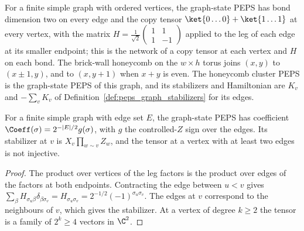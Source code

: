 \begin{definition}
    \label{def:peps_honeycomb_cluster}
    \leanok
    For a finite simple graph with ordered vertices, the graph-state PEPS
    has bond dimension two on every edge and the copy tensor
    $\ket{0\ldots0}+\ket{1\ldots1}$ at every vertex, with the matrix
    $H=\frac1{\sqrt2}\left(\begin{smallmatrix}1&1\\1&-1\end{smallmatrix}\right)$
    applied to the leg of each edge at its smaller endpoint; this is the
    network of a copy tensor at each vertex and $H$ on each bond. The
    brick-wall honeycomb on the $w\times h$ torus joins $(x,y)$ to
    $(x\pm1,y)$, and to $(x,y+1)$ when $x+y$ is even. The honeycomb cluster
    PEPS is the graph-state PEPS of this graph, and its stabilizers and
    Hamiltonian are $K_v$ and $-\sum_vK_v$ of
    Definition~\ref{def:peps_graph_stabilizers} for its edges.
\end{definition}

\begin{lemma}
    \label{thm:peps_graph_state_peps}
    \leanok
    For a finite simple graph with edge set $E$, the graph-state PEPS has
    coefficient $\Coeff(\sigma)=2^{-|E|/2}g(\sigma)$, with $g$ the
    controlled-$Z$ sign over the edges. Its stabilizer at $v$ is
    $X_v\prod_{w\sim v}Z_w$, and the tensor at a vertex with at least two
    edges is not injective.
\end{lemma}

\begin{proof}\leanok
    The product over vertices of the leg factors is the product over edges
    of the factors at both endpoints. Contracting the edge between $u<v$
    gives $\sum_\beta H_{\sigma_u\beta}\delta_{\beta\sigma_v}
        =H_{\sigma_u\sigma_v}=2^{-1/2}(-1)^{\sigma_u\sigma_v}$. The edges at
    $v$ correspond to the neighbours of $v$, which gives the stabilizer.
    At a vertex of degree $k\geq2$ the tensor is a family of $2^k\geq4$
    vectors in $\C^2$.
\end{proof}

